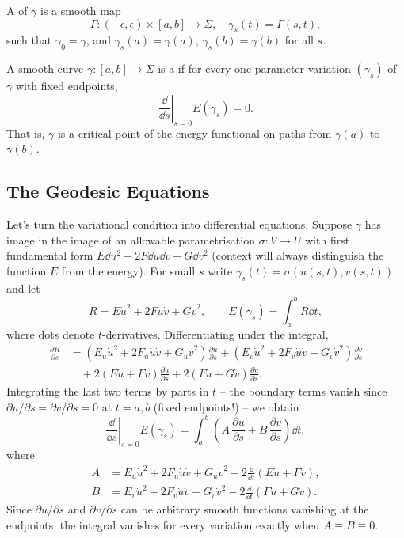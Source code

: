 \begin{definition}[Variation]
    A  of $\gamma$ is a smooth map
    $$
    \Gamma: (-\epsilon, \epsilon) \times [a, b] \rightarrow \Sigma, \quad \gamma_s(t) = \Gamma(s, t),
    $$
    such that $\gamma_0 = \gamma$, and $\gamma_s(a) = \gamma(a)$, $\gamma_s(b) = \gamma(b)$ for all $s$.
\end{definition}

\begin{definition}[Geodesic]
    A smooth curve $\gamma: [a, b] \rightarrow \Sigma$ is a  if for every one-parameter variation $(\gamma_s)$ of $\gamma$ with fixed endpoints,
    $$
    \left.\frac{\dd}{\dd s}\right|_{s = 0} E(\gamma_s) = 0.
    $$
    That is, $\gamma$ is a critical point of the energy functional on paths from $\gamma(a)$ to $\gamma(b)$.
\end{definition}

\subsection{The Geodesic Equations}

Let's turn the variational condition into differential equations. Suppose $\gamma$ has image in the image of an allowable parametrisation $\sigma: V \rightarrow U$ with first fundamental form $E \dd u^2 + 2F \dd u \dd v + G \dd v^2$ (context will always distinguish the function $E$ from the energy). For small $s$ write $\gamma_s(t) = \sigma(u(s,t), v(s,t))$ and let
$$
R = E \dot u^2 + 2F \dot u \dot v + G \dot v^2, \qquad E(\gamma_s) = \int_a^b R \dd t,
$$
where dots denote $t$-derivatives. Differentiating under the integral,
\begin{align*}
    \frac{\partial R}{\partial s} &= \left(E_u \dot u^2 + 2F_u \dot u \dot v + G_u \dot v^2\right)\frac{\partial u}{\partial s} + \left(E_v \dot u^2 + 2F_v \dot u \dot v + G_v \dot v^2\right)\frac{\partial v}{\partial s} \\
    &\quad + 2\left(E \dot u + F \dot v\right) \frac{\partial \dot u}{\partial s} + 2\left(F \dot u + G \dot v\right)\frac{\partial \dot v}{\partial s}.
\end{align*}
Integrating the last two terms by parts in $t$ -- the boundary terms vanish since $\partial u/\partial s = \partial v /\partial s = 0$ at $t = a, b$ (fixed endpoints!) -- we obtain
$$
\left.\frac{\dd}{\dd s}\right|_{s=0} E(\gamma_s) = \int_a^b \left(A \, \frac{\partial u}{\partial s} + B \, \frac{\partial v}{\partial s}\right) \dd t,
$$
where
\begin{align*}
    A &= E_u \dot u^2 + 2 F_u \dot u \dot v + G_u \dot v^2 - 2 \frac{\dd}{\dd t}\left(E \dot u + F \dot v\right), \\
    B &= E_v \dot u^2 + 2F_v \dot u \dot v + G_v \dot v^2 - 2\frac{\dd}{\dd t}\left(F \dot u + G \dot v\right).
\end{align*}
Since $\partial u/\partial s$ and $\partial v/\partial s$ can be arbitrary smooth functions vanishing at the endpoints, the integral vanishes for every variation exactly when $A \equiv B \equiv 0$.

